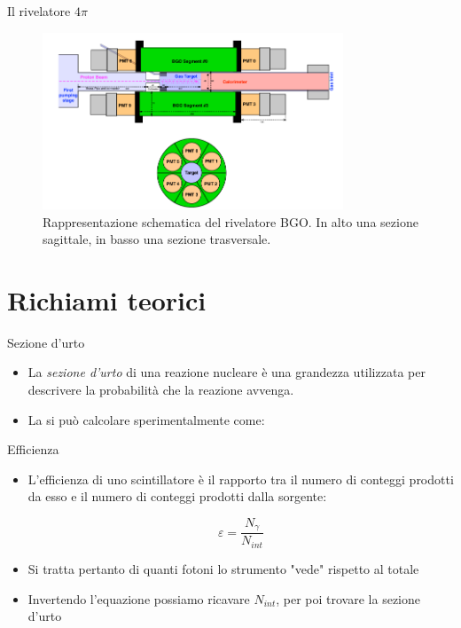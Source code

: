 \documentclass [xcolor=svgnames] {beamer}
\begin{document}
\begin{frame}{Il rivelatore $4\pi$}
	\begin{figure}[h]
		\includegraphics[width=0.8\textwidth]{img/BGO.png}
		\caption{Rappresentazione schematica del rivelatore BGO. In alto una sezione sagittale, in basso una sezione trasversale.}
	\end{figure}
\end{frame}

\section{Richiami teorici}
\begin{frame}{Sezione d'urto}
	\begin{itemize}
		\item La \emph{sezione d'urto} di una reazione nucleare è una grandezza utilizzata per descrivere la probabilità che la reazione avvenga.
		\item La si può calcolare sperimentalmente come:
		
		
	\end{itemize}
\end{frame}

\begin{frame}{Efficienza}
	\begin{itemize}
		\item L'efficienza di uno scintillatore è il rapporto tra il numero di conteggi prodotti da esso e il numero di conteggi prodotti dalla sorgente:
		
		\begin{equation}
			\varepsilon = \dfrac{N_{\gamma}}{N_{int}}
		\end{equation}
		
		\item Si tratta pertanto di quanti fotoni lo strumento "vede" rispetto al totale
		\item Invertendo l'equazione possiamo ricavare $N_{int}$, per poi trovare la sezione d'urto
	\end{itemize}
\end{frame}
\end{document}

